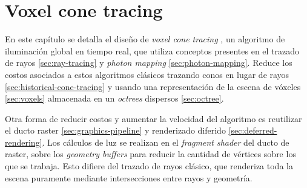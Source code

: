 


\graphicspath{{chapters/3_diseño/figures/}}

\chapter{Voxel cone tracing}\label{chap:design}

En este capítulo se detalla el diseño de \textit{voxel cone tracing} \cite{voxel-cone-tracing}, un algoritmo de iluminación global en tiempo real, que utiliza conceptos presentes en el trazado de rayos \ref{sec:ray-tracing} y \textit{photon mapping} \ref{sec:photon-mapping}.
Reduce los costos asociados a estos algoritmos clásicos trazando conos en lugar de rayos \ref{sec:historical-cone-tracing} y usando una representación de la escena de vóxeles \ref{sec:voxels} almacenada en un \textit{octrees} dispersos \ref{sec:octree}.

Otra forma de reducir costos y aumentar la velocidad del algoritmo es reutilizar el ducto raster \ref{sec:graphics-pipeline} y renderizado diferido \ref{sec:deferred-rendering}.
Los cálculos de luz se realizan en el \textit{fragment shader} del ducto de raster, sobre los \textit{geometry buffers} para reducir la cantidad de vértices sobre los que se trabaja.
Esto difiere del trazado de rayos clásico, que renderiza toda la escena puramente mediante intersecciones entre rayos y geometría.

